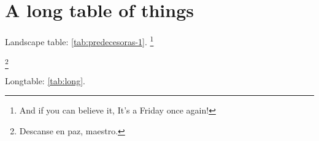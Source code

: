 % 
% 
% 




\chapter{A long table of things}

Landscape table: \autoref{tab:predecesoras-1}. \lipsum[90]\footnote{And if you can believe it, It's a Friday once again!} 

\lipsum[91-93]\footnote{Descanse en paz, maestro.} 

Longtable: \autoref{tab:long}. 



